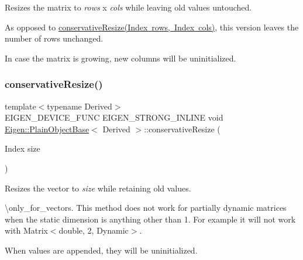 Resizes the matrix to {\itshape rows} x {\itshape cols} while leaving old values untouched.

As opposed to \mbox{\hyperlink{class_eigen_1_1_plain_object_base_a5e06c62950ba98fe8ba9c7d4be9c19e4}{conservative\+Resize(\+Index rows, Index cols)}}, this version leaves the number of rows unchanged.

In case the matrix is growing, new columns will be uninitialized. \mbox{\label{class_eigen_1_1_plain_object_base_a5429214e7c1ffaf7294a93a5cec62007}} 
\subsubsection{\texorpdfstring{conservativeResize()}{conservativeResize()}\hspace{0.1cm}{\footnotesize\ttfamily [4/4]}}
{\footnotesize\ttfamily template$<$typename Derived$>$ \\
E\+I\+G\+E\+N\+\_\+\+D\+E\+V\+I\+C\+E\+\_\+\+F\+U\+NC E\+I\+G\+E\+N\+\_\+\+S\+T\+R\+O\+N\+G\+\_\+\+I\+N\+L\+I\+NE void \mbox{\hyperlink{class_eigen_1_1_plain_object_base}{Eigen\+::\+Plain\+Object\+Base}}$<$ Derived $>$\+::conservative\+Resize (\begin{DoxyParamCaption}\item[{Index}]{size }\end{DoxyParamCaption})\hspace{0.3cm}{\ttfamily [inline]}}

Resizes the vector to {\itshape size} while retaining old values.

\textbackslash{}only\+\_\+for\+\_\+vectors. This method does not work for partially dynamic matrices when the static dimension is anything other than 1. For example it will not work with Matrix$<$double, 2, Dynamic$>$.

When values are appended, they will be uninitialized. \mbox{\label{class_eigen_1_1_plain_object_base_a7775d274035c4ef541aa0fc9a3ad30a2}} 
